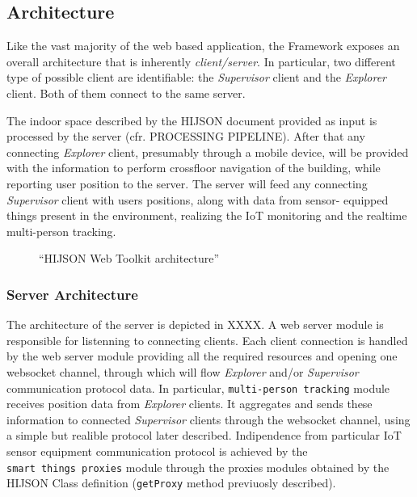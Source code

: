 \documentclass{sig-alternate}
\begin{document}
\subsection{Architecture}\label{architecture}

Like the vast majority of the web based application, the Framework exposes an
overall architecture that is inherently \emph{client/server}. In particular,
two different type of possible client are identifiable: the \emph{Supervisor}
client and the \emph{Explorer} client. Both of them connect to the same
server.

The indoor space described by the HIJSON document provided as input is
processed by the server (cfr. PROCESSING PIPELINE). After that any connecting
\emph{Explorer} client, presumably through a mobile device, will be provided
with the information to perform crossfloor navigation of the building, while
reporting user position to the server. The server will feed any connecting
\emph{Supervisor} client with users positions, along with data from sensor-
equipped things present in the environment, realizing the IoT monitoring and
the realtime multi-person tracking.

\begin{figure}[t]
\centering
{}
\caption{``HIJSON Web Toolkit architecture''}
\label{fig:pipeline}
\end{figure}

\subsubsection{Server Architecture}\label{server-architecture}

The architecture of the server is depicted in XXXX. A web server module
is responsible for listenning to connecting clients. Each client
connection is handled by the web server module providing all the
required resources and opening one websocket channel, through which will
flow \emph{Explorer} and/or \emph{Supervisor} communication protocol
data. In particular, \texttt{multi-person\ tracking} module receives
position data from \emph{Explorer} clients. It aggregates and sends
these information to connected \emph{Supervisor} clients through the
websocket channel, using a simple but realible protocol later described.
Indipendence from particular IoT sensor equipment communication protocol
is achieved by the \texttt{smart\ things\ proxies} module through the
proxies modules obtained by the HIJSON Class definition
(\texttt{getProxy} method previuosly described).
\end{document}
